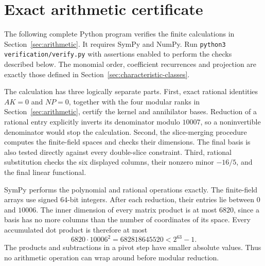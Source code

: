 \section{Exact arithmetic certificate}
\label{app:certificate}

The following complete Python program verifies the finite calculations
in Section~\ref{sec:arithmetic}. It requires SymPy and NumPy. Run
\texttt{python3 verification/verify.py} with assertions enabled to perform
the checks described below. The monomial order, coefficient recurrences
and projection are exactly those defined in
Section~\ref{sec:characteristic-classes}.

The calculation has three logically separate parts. First, exact
rational identities $AK=0$ and $NP=0$, together with the four modular
ranks in Section~\ref{sec:arithmetic}, certify the kernel and
annihilator bases. Reduction of a rational entry explicitly inverts
its denominator modulo $10007$, so a noninvertible denominator would
stop the calculation. Second, the slice-merging procedure computes
the finite-field spaces and checks their dimensions. The final basis
is also tested directly against every double-slice constraint.
Third, rational substitution checks the six displayed columns, their
nonzero minor $-16/5$, and the final linear functional.

SymPy performs the polynomial and rational operations exactly.
The finite-field arrays use signed 64-bit integers. After each
reduction, their entries lie between $0$ and $10006$. The inner
dimension of every matrix product is at most $6820$, since a basis
has no more columns than the number of coordinates of its space.
Every accumulated dot product is therefore at most
\[
 6820\cdot10006^2=682818645520<2^{63}-1.
\]
The products and subtractions in a pivot step have smaller absolute
values. Thus no arithmetic operation can wrap around before modular
reduction.


